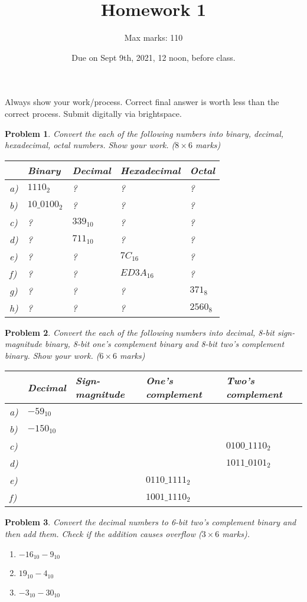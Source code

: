 \documentclass{article}
\title{Homework 1}
\author{Max marks: 110}
\date{Due on Sept 9th, 2021, 12 noon, before class. }
\newtheorem{prob}{Problem}
\begin{document}
\maketitle
Always show your work/process. Correct final answer is worth less than the
correct process. Submit digitally via brightspace.

\begin{prob}
  Convert the each of the following numbers into binary, decimal, hexadecimal,
octal numbers. Show your work. ($8 \times 6 $ marks)

  \begin{tabular}{lllll}
    \toprule
     & Binary & Decimal & Hexadecimal & Octal \\
    \midrule
    a)& $1110_2$     & ? & ? & ?  \\
    b)& $10\_0100_2$ & ? & ? & ? \\
    c)& ? & $339_{10}$   & ? & ? \\
    d)& ? & $711_{10}$   & ? & ? \\
    e)& ? & ? & $7C_{16}$    & ? \\
    f)& ? & ? & $ED3A_{16}$  & ? \\
    g)& ? & ? & ? & $371_8$\\
    h)& ? & ? & ? & $2560_8$\\
    \bottomrule
  \end{tabular}
\end{prob}

\begin{prob}
  Convert the each of the following numbers into decimal, 8-bit sign-magnitude binary,
  8-bit one's complement binary and 8-bit two's complement binary. Show your work. ($6 \times 6 $ marks)

  \begin{tabular}{lllll}
    \toprule
    & Decimal & Sign-magnitude & One's complement & Two's complement \\
    \midrule
    a) & $-59_{10}$ & & & \\
    b) & $-150_{10}$ & & & \\
    c) & & & & $0100\_1110_2$ \\
    d) & &  & & $1011\_0101_2$\\
    e) & & & $0110\_1111_2$&  \\
    f) & &  & $1001\_1110_2$& \\
    \bottomrule
  \end{tabular}
\end{prob}

\begin{prob}
  Convert the decimal numbers to 6-bit two's complement binary and then add
  them. Check if the addition causes overflow ($3 \times 6$ marks).
  \begin{enumerate}
  \item $-16_{10} - 9_{10}$
  \item $19_{10} - 4_{10}$
  \item $-3_{10} - 30_{10}$
  \end{enumerate}
\end{prob}
\end{document}
